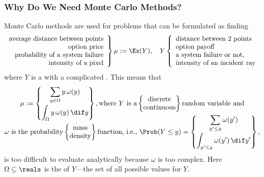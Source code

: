 \documentclass[10pt,compress,xcolor={usenames,dvipsnames}]{beamer} %
\begin{document}
\begin{frame}
\frametitle{Why Do We Need Monte Carlo Methods?}
\vspace{-2ex}
Monte Carlo methods are used for problems that can be formulated as finding 
\[
\left . \begin{array}{r}\text{average distance between points} \\ 
\text{option price} \\ 
\text{probability of a system failure} \\ 
\text{intensity of a pixel} \end{array} \right \}
\mu := \Ex(Y), \quad Y\left \{ \begin{array}{l}\text{distance between 2  points} \\
\text{option payoff} \\ 
\text{a system failure or not, } \\ 
\text{intensity of an incident ray} \end{array} \right .
\]
where $Y$ is a  with a \alert{complicated} .  This means that
\begin{multline*}
\mu := \begin{Bmatrix}\displaystyle
\sum_{y \in \Omega} y \, \omega(y) \\[3ex]
\displaystyle
\int_{\Omega} y \, \omega(y) \, \dif y 
\end{Bmatrix},
\text{where $Y$ is a}
\begin{Bmatrix}
\text{discrete} \\
\text{continuous}
\end{Bmatrix}
\text{random variable and} \\[-3ex]
\omega \text{ is the probability}
\begin{Bmatrix}
\text{mass} \\
\text{density}
\end{Bmatrix}
\text{function, i.e., }\Prob(Y \le y) = 
\begin{Bmatrix}\displaystyle
\sum_{y' \le y} \omega(y') \\[3ex]
\displaystyle
\int_{y' \le y} \omega(y') \, \dif y' 
\end{Bmatrix},
\end{multline*}
is too difficult to evaluate analytically because $\omega$ is too complex.  Here $\Omega \subseteq \reals$ is the   of $Y$---the set of all possible values for $Y$.  

\end{frame}
\end{document}
